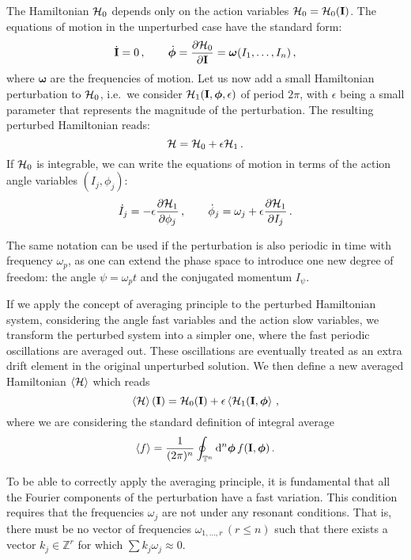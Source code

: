 The Hamiltonian $\mathcal{H}_0$ depends only on the action variables $\mathcal{H}_0=\mathcal{H}_0(\vb{I})$. The equations of motion in the unperturbed case have the standard form:
\begin{equation}
    \dot{\vb{I}}=0\,, \qquad \dot{\boldsymbol{\phi}} = \pdv{\mathcal{H}_0}{\vb{I}} = \boldsymbol{\omega}(I_1,\dots,I_n) \,,
\end{equation}
where $\boldsymbol{\omega}$ are the frequencies of motion.
Let us now add a small Hamiltonian perturbation to $\mathcal{H}_0$, i.e.\ we consider $\mathcal{H}_1(\vb{I}, \boldsymbol{\phi}, \epsilon)$ of period $2\pi$, with $\epsilon$ being a small parameter that represents the magnitude of the perturbation. The resulting perturbed Hamiltonian reads:
\begin{equation}
    \mathcal{H} = \mathcal{H}_0 + \epsilon \mathcal{H}_1\,.
\end{equation}
%
If $\mathcal{H}_0$ is integrable, we can write the equations of motion in terms of the action angle variables $(I_j,\phi_j)$:
%
\begin{equation}
    \dot I_j = -\epsilon \pdv{\mathcal{H}_1}{\phi_j}\,,\qquad
	\dot \phi_j = \omega_j + \epsilon \pdv{\mathcal{H}_1}{I_j}\, .
\end{equation}
%

The same notation can be used if the perturbation is also periodic in time with frequency $\omega_p$, as one can extend the phase space to introduce one new degree of freedom: the angle $\psi=\omega_p t$ and the conjugated momentum $I_\psi$.

If we apply the concept of averaging principle to the perturbed Hamiltonian system, considering the angle fast variables and the action slow variables,
we transform the perturbed system into a simpler one, where the fast periodic oscillations are averaged out. These oscillations are eventually treated as an extra drift element in the original unperturbed solution. We then define a new averaged Hamiltonian $\left<{\mathcal{H}}\right>$ which reads
%
\begin{equation} 
	\left<{\mathcal{H}}\right>(\vb{I}) = \mathcal{H}_0(\vb{I})+\epsilon \left<{ \mathcal{H}_1(\vb{I}, \boldsymbol{\phi} }\right>\,,
\end{equation}
%
where we are considering the standard definition of integral average
%
\begin{equation} 
	\left<{f}\right> = \frac{1}{(2\pi)^n}\oint_{\mathbb{T}^n}\dd^n\boldsymbol{\phi}\, f(\vb{I}, \boldsymbol{\phi}) \, .
\end{equation}
%

To be able to correctly apply the averaging principle, it is fundamental that all the Fourier components of the perturbation have a fast variation. This condition requires that the frequencies $\omega_j$ are not under any resonant conditions. That is, there must be no vector of frequencies $\omega_{1,\ldots,r}\,(r\leq n)$ such that there exists a vector $k_j \in \mathbb{Z}^r$ for which $\sum k_j \omega_j \approx 0$.

